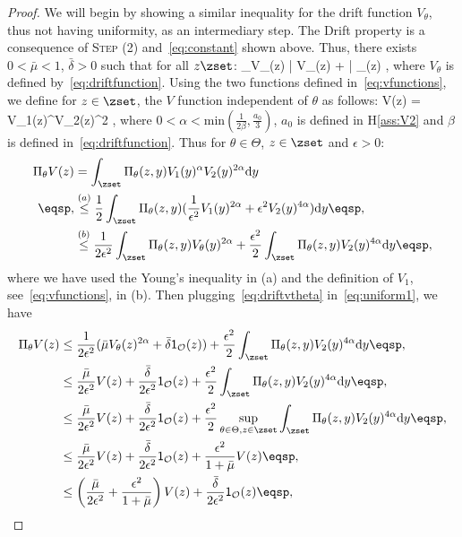 \documentclass[letterpaper]{article} %
\begin{document}
\begin{proof}
We will begin by showing a similar inequality for the drift function $V_\theta$, thus not having uniformity, as an intermediary step.
The Drift property is a consequence of \textsc{Step (2)} and~\eqref{eq:constant} shown above.
Thus, there exists $0 < \bar{\mu} < 1$, $\bar{\delta} > 0$ such that for all $z \zset$:
\beq\label{eq:driftvtheta}
\Pi_\theta V_\theta(z) \leq \bar{\mu} V_\theta(z) + \bar{\delta} _{}(z) \eqsp,
\eeq
where $V_\theta$ is defined by~\eqref{eq:driftfunction}.
Using the two functions defined in~\eqref{eq:vfunctions}, we define for $z \in \zset$, the $V$ function independent of $\theta$ as follows:
\beq\label{eq:defv}
V(z) = V_1(z)^\alpha V_2(z)^{2\alpha} \eqsp,
\eeq
where $0 < \alpha < \textrm{min}(\frac{1}{2\beta},\frac{a_0}{3})$, $a_0$ is defined in H\ref{ass:V2} and $\beta$ is defined in~\eqref{eq:driftfunction}.
Thus for $\theta \in \Theta$, $z \in \zset$ and $\epsilon >0$:
\begin{align}\notag
\Pi_\theta V(z) & = \int_{\zset} \Pi_\theta(z,y) V_1(y)^\alpha V_2(y)^{2\alpha} \textrm{d}y\\ \notag \eqsp,
& \overset{(a)}{\leq} \frac{1}{2} \int_{\zset} \Pi_\theta(z,y) (\frac{1}{\epsilon^2}V_1(y)^{2\alpha} + \epsilon^2 V_2(y)^{4\alpha}) \textrm{d}y \eqsp,\\ 
& \overset{(b)}{\leq} \frac{1}{2\epsilon^2} \int_{\zset} \Pi_\theta(z,y) V_\theta(y)^{2\alpha} + \frac{\epsilon^2}{2}  \int_{\zset} \Pi_\theta(z,y)  V_2(y)^{4\alpha} \textrm{d}y \label{eq:uniform1} \eqsp,
\end{align}
where we have used the Young's inequality in (a) and the definition of $V_1$, see~\eqref{eq:vfunctions}, in (b).
Then plugging~\eqref{eq:driftvtheta} in~\eqref{eq:uniform1}, we have
\begin{align}
\Pi_\theta V(z) & \leq \frac{1}{2\epsilon^2} (\bar{\mu} V_\theta(z)^{2\alpha} + \bar{\delta} \mathsf{1}_{\mathcal{O}}(z) ) + \frac{\epsilon^2}{2}  \int_{\zset} \Pi_\theta(z,y)  V_2(y)^{4\alpha} \textrm{d}y \eqsp,\\
& \leq \frac{\bar{\mu}}{2 \epsilon^2} V(z) +\frac{\bar{\delta}}{2 \epsilon^2} \mathsf{1}_{\mathcal{O}}(z)  + \frac{\epsilon^2}{2}  \int_{\zset} \Pi_\theta(z,y)  V_2(y)^{4\alpha} \textrm{d}y \eqsp,\\
& \leq \frac{\bar{\mu}}{2 \epsilon^2} V(z) +\frac{\bar{\delta}}{2 \epsilon^2} \mathsf{1}_{\mathcal{O}}(z)  + \frac{\epsilon^2}{2} \sup \limits_{\theta \in \Theta, z \in \zset} \int_{\zset} \Pi_\theta(z,y)  V_2(y)^{4\alpha} \textrm{d}y \eqsp,\\
& \leq \frac{\bar{\mu}}{2 \epsilon^2} V(z) +\frac{\bar{\delta}}{2 \epsilon^2} \mathsf{1}_{\mathcal{O}}(z)  + \frac{\epsilon^2}{1 + \bar{\mu}}V(z) \eqsp,\\
& \leq \left(\frac{\bar{\mu}}{2 \epsilon^2} + \frac{\epsilon^2}{1 + \bar{\mu}} \right) V(z) +\frac{\bar{\delta}}{2 \epsilon^2} \mathsf{1}_{\mathcal{O}}(z) \eqsp,
\end{align}


\end{proof}
\end{document}
